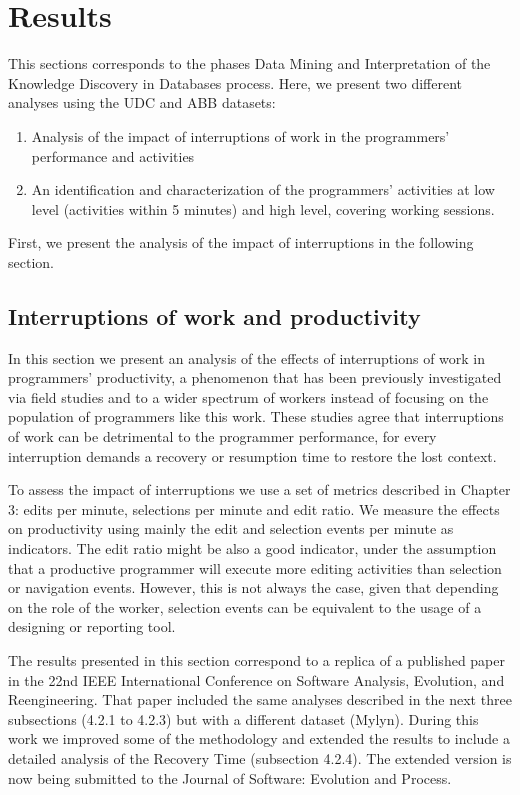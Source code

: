 \chapter{Results}


This sections corresponds to the phases Data Mining and Interpretation of the Knowledge Discovery in Databases process. Here, we present two different analyses using the UDC and ABB datasets:
\begin{enumerate}
	\item Analysis of the impact of interruptions of work in the programmers' performance and activities
	\item An identification and characterization of the programmers' activities at low level (activities within 5 minutes) and high level, covering working sessions.
\end{enumerate}

First, we present the analysis of the impact of interruptions in the following section.

\section{Interruptions of work and productivity}
In this section we present an analysis of the effects of interruptions of work in programmers' productivity, a phenomenon that has been previously investigated via field studies and to a wider spectrum of workers \cite{GM04, MGK08, CHW04, ABV12} instead of focusing on the population of programmers like this work. These studies agree that interruptions of work can be detrimental to the programmer performance, for every interruption demands a recovery or resumption time to restore the lost context.

To assess the impact of interruptions we use a set of metrics described in Chapter 3: edits per minute, selections per minute and edit ratio. We measure the effects on productivity using mainly the edit and selection events per minute as indicators. The edit ratio \cite{KM06} might be also a good indicator, under the assumption that a productive programmer will execute more editing activities than selection or navigation events. However, this is not always the case, given that depending on the role of the worker, selection events can be equivalent to the usage of a designing or reporting tool.

The results presented in this section correspond to a replica of a published paper \cite{SRV15} in the 22nd IEEE International Conference on Software Analysis, Evolution, and Reengineering. That paper included the same analyses described in the next three subsections (4.2.1 to 4.2.3) but with a different dataset (Mylyn). During this work we improved some of the methodology and extended the results to include a detailed analysis of the Recovery Time (subsection 4.2.4). The extended version is now being submitted to the Journal of Software: Evolution and Process.


